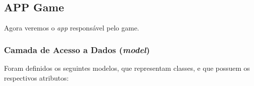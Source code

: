\clearpage
\subsection{APP Game}
Agora veremos o \textit{app} responsável pelo game.
\subsubsection{Camada de Acesso a Dados (\textit{model})}
Foram definidos os seguintes modelos, que representam classes, e que possuem os respectivos atributos:
